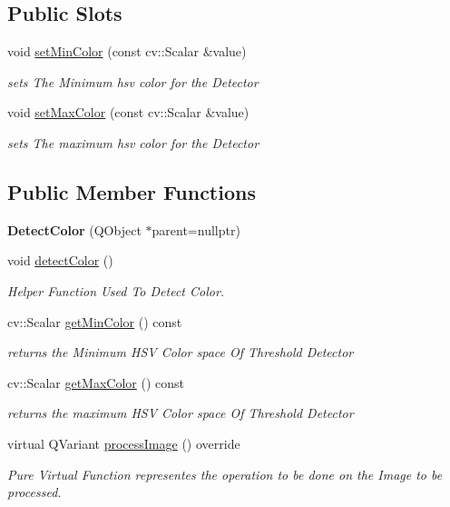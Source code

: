 \subsection*{Public Slots}
\begin{DoxyCompactItemize}
\item 
void \hyperlink{class_image_processor_1_1_detect_color_af9f1efdf1535b8a8516c3feb536fc8b8}{set\+Min\+Color} (const cv\+::\+Scalar \&value)
\begin{DoxyCompactList}\small\item\em sets The Minimum hsv color for the Detector \end{DoxyCompactList}\item 
void \hyperlink{class_image_processor_1_1_detect_color_a71bfe53fe223a7342e17e64adf483b84}{set\+Max\+Color} (const cv\+::\+Scalar \&value)
\begin{DoxyCompactList}\small\item\em sets The maximum hsv color for the Detector \end{DoxyCompactList}\end{DoxyCompactItemize}
\subsection*{Public Member Functions}
\begin{DoxyCompactItemize}
\item 
\mbox{\label{class_image_processor_1_1_detect_color_a2e6f1c8194a6f98bd9ef1f61c45ca96a}} 
{\bfseries Detect\+Color} (Q\+Object $\ast$parent=nullptr)
\item 
void \hyperlink{class_image_processor_1_1_detect_color_a2097eb7955a1f87fa5aa21944197fa17}{detect\+Color} ()
\begin{DoxyCompactList}\small\item\em Helper Function Used To Detect Color. \end{DoxyCompactList}\item 
cv\+::\+Scalar \hyperlink{class_image_processor_1_1_detect_color_a968a764ffc529d9a7022942c047559eb}{get\+Min\+Color} () const
\begin{DoxyCompactList}\small\item\em returns the Minimum H\+SV Color space Of Threshold Detector \end{DoxyCompactList}\item 
cv\+::\+Scalar \hyperlink{class_image_processor_1_1_detect_color_a80a162584cbb4f2ccb452f35bfee19f5}{get\+Max\+Color} () const
\begin{DoxyCompactList}\small\item\em returns the maximum H\+SV Color space Of Threshold Detector \end{DoxyCompactList}\item 
virtual Q\+Variant \hyperlink{class_image_processor_1_1_detect_color_afb14622f8e1390f1cf887cc8bf1da568}{process\+Image} () override
\begin{DoxyCompactList}\small\item\em Pure Virtual Function representes the operation to be done on the Image to be processed. \end{DoxyCompactList}\end{DoxyCompactItemize}
